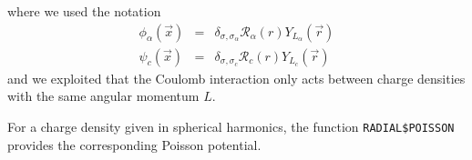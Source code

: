 \documentclass[11pt,a4paper]{report}
\begin{document}
where we used the notation
\begin{eqnarray}
\phi_\alpha(\vec{x})&=&\delta_{\sigma,\sigma_\alpha}
\mathcal{R}_\alpha(r)Y_{L_\alpha}(\vec{r})
\nonumber\\
\psi_c(\vec{x})&=&\delta_{\sigma,\sigma_c}
\mathcal{R}_c(r)Y_{L_c}(\vec{r})
\end{eqnarray}
and we exploited that the Coulomb interaction only acts between charge
densities with the same angular momentum $L$.

For a charge density given in spherical harmonics, the function
\verb|RADIAL$POISSON| provides the corresponding Poisson potential.





\printindex


\end{document}
